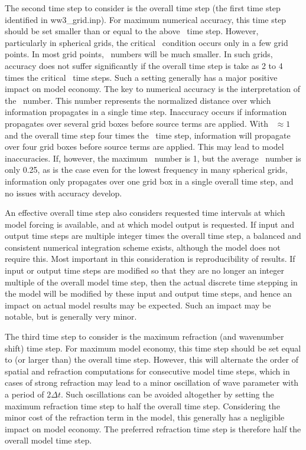 The second time step to consider is the overall time step (the first time step
identified in {\file ww3\_grid.inp}). For maximum numerical accuracy, this time
step should be set smaller than or equal to the above \cfl\ time step.
However, particularly in spherical grids, the critical \cfl\ condition occurs
only in a few grid points. In most grid points, \cfl\ numbers will be much
smaller. In such grids, accuracy does not suffer significantly if the overall
time step is take as 2 to 4 times the critical \cfl\ time steps. Such a
setting generally has a major positive impact on model economy. The key to
numerical accuracy is the interpretation of the \cfl\ number. This number
represents the normalized distance over which information propagates in a
single time step. Inaccuracy occurs if information propagates over several
grid boxes before source terms are applied. With \cfl\ $\approx 1$ and the
overall time step four times the \cfl\ time step, information will propagate
over four grid boxes before source terms are applied. This may lead to model
inaccuracies. If, however, the maximum \cfl\ number is 1, but the average
\cfl\ number is only 0.25, as is the case even for the lowest frequency in
many spherical grids, information only propagates over one grid box in a
single overall time step, and no issues with accuracy develop.

An effective overall time step also considers requested time intervals at
which model forcing is available, and at which model output is requested. If
input and output time steps are multiple integer times the overall time step,
a balanced and consistent numerical integration scheme exists, although the
model does not require this. Most important in this consideration is
reproducibility of results. If input or output time steps are modified so that
they are no longer an integer multiple of the overall model time step, then
the actual discrete time stepping in the model will be modified by these input
and output time steps, and hence an impact on actual model results may be
expected. Such an impact may be notable, but is generally very minor.

The third time step to consider is the maximum refraction (and wavenumber
shift) time step. For maximum model economy, this time step should be set
equal to (or larger than) the overall time step. However, this will alternate
the order of spatial and refraction computations for consecutive model time
steps, which in cases of strong refraction may lead to a minor oscillation of
wave parameter with a period of $2 \Delta t$. Such oscillations can be avoided
altogether by setting the maximum refraction time step to half the overall
time step. Considering the minor cost of the refraction term in the model,
this generally has a negligible impact on model economy. The preferred
refraction time step is therefore half the overall model time step.

